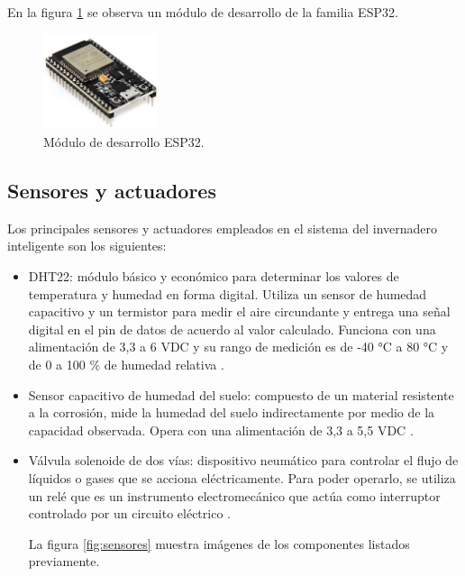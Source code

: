 En la figura \ref{fig:esp32} se observa un módulo de desarrollo de la familia ESP32.



\begin{figure}[h]
	\centering
	\includegraphics[width=0.30\textwidth]{./Figures/esp32.jpg}
	\caption[Módulo de desarrollo ESP32.]{Módulo de desarrollo ESP32.}
	\label{fig:esp32}

\end{figure}

\subsection{Sensores y actuadores}
\label{sec:Sensores y actuadores}
Los principales sensores y actuadores empleados en el sistema del invernadero inteligente son los siguientes:
\begin{itemize}

\item DHT22: módulo básico y económico para determinar los valores de temperatura y humedad en forma digital. Utiliza un sensor de humedad capacitivo y un termistor para medir el aire circundante y entrega una señal digital en el pin de datos de acuerdo al valor calculado. Funciona con una alimentación de 3,3 a 6 VDC y su rango de medición es de -40 °C a 80 °C y de 0 a 100 \% de humedad relativa \citep{dht22}.

\item Sensor capacitivo de humedad del suelo: compuesto de un material resistente a la corrosión, mide la humedad del suelo indirectamente por medio de la capacidad observada. Opera con una alimentación de 3,3 a 5,5 VDC \citep{soilsensor}.

\item Válvula solenoide de dos vías: dispositivo neumático para controlar el flujo de líquidos o gases que se acciona eléctricamente. Para poder operarlo, se utiliza un relé que es un instrumento electromecánico que actúa como interruptor controlado por un circuito eléctrico \citep{valve}\citep{rele}.

La figura \ref{fig:sensores} muestra imágenes de los componentes listados previamente.

\end{itemize}
%

